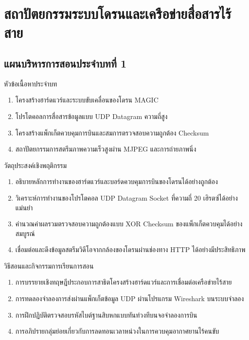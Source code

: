 \chapter{สถาปัตยกรรมระบบโดรนและเครือข่ายสื่อสารไร้สาย}
\label{chap:ch01}

\section*{แผนบริหารการสอนประจำบทที่ 1}

\begin{planbox}{หัวข้อเนื้อหาประจำบท}
\begin{enumerate}
    \item โครงสร้างฮาร์ดแวร์และระบบขับเคลื่อนของโดรน MAGIC
    \item โปรโตคอลการสื่อสารข้อมูลแบบ UDP Datagram ความถี่สูง
    \item โครงสร้างแพ็กเก็ตควบคุมการบินและสมการตรวจสอบความถูกต้อง Checksum
    \item สถาปัตยกรรมการสตรีมภาพความเร็วสูงผ่าน MJPEG และการถ่ายภาพนิ่ง
\end{enumerate}
\end{planbox}

\begin{planbox}{วัตถุประสงค์เชิงพฤติกรรม}
\begin{enumerate}
    \item อธิบายหลักการทำงานของฮาร์ดแวร์และบอร์ดควบคุมการบินของโดรนได้อย่างถูกต้อง
    \item วิเคราะห์การทำงานของโปรโตคอล UDP Datagram Socket ที่ความถี่ 20 เฮิรตซ์ได้อย่างแม่นยำ
    \item คำนวณค่าผลรวมตรวจสอบความถูกต้องแบบ XOR Checksum ของแพ็กเก็ตควบคุมได้อย่างสมบูรณ์
    \item เชื่อมต่อและดึงข้อมูลสตรีมวิดีโอจากกล้องของโดรนผ่านช่องทาง HTTP ได้อย่างมีประสิทธิภาพ
\end{enumerate}
\end{planbox}

\newpage

\begin{planbox}{วิธีสอนและกิจกรรมการเรียนการสอน}
\begin{enumerate}
    \item การบรรยายเชิงทฤษฎีประกอบการสาธิตโครงสร้างฮาร์ดแวร์และการเชื่อมต่อเครือข่ายไร้สาย
    \item การทดลองจำลองการส่งผ่านแพ็กเก็ตข้อมูล UDP ผ่านโปรแกรม Wireshark บนระบบจำลอง
    \item การฝึกปฏิบัติตรวจสอบรหัสไบต์ฐานสิบหกแบบทันท่วงทีบนจอจำลองการบิน
    \item การอภิปรายกลุ่มย่อยเกี่ยวกับการลดทอนเวลาหน่วงในการควบคุมอากาศยานไร้คนขับ
\end{enumerate}
\end{planbox}

